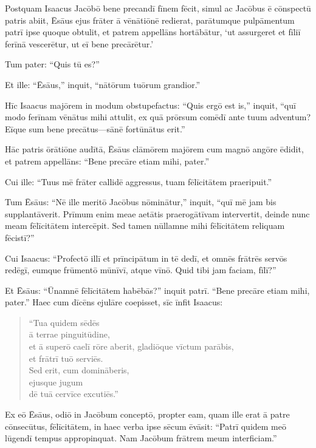 \Versus Postquam Isaacus Jacōbō bene precandī fīnem fēcit, simul ac Jacōbus ē cōnspectū patris abiit, Ēsāus ejus frāter ā vēnātiōnē redierat,
\Versus parātumque pulpāmentum patrī ipse quoque obtulit, et patrem appellāns hortābātur, `ut assurgeret et fīliī ferīnā vescerētur, ut eī bene precārētur.'

\Versus Tum pater: ``Quis tū es?''

Et ille: ``Ēsāus,'' inquit, ``nātōrum tuōrum grandior.''

\Versus Hīc Isaacus majōrem in modum obstupefactus: ``Quis ergō est is,'' inquit, ``quī modo ferīnam vēnātus mihi attulit, ex quā prōrsum comēdī ante tuum adventum? Eīque sum bene precātus—sānē fortūnātus erit.''

\Versus Hāc patris ōrātiōne audītā, Ēsāus clāmōrem majōrem cum magnō angōre ēdidit, et patrem appellāns: ``Bene precāre etiam mihi, pater.''

\Versus Cui ille: ``Tuus mē frāter callidē aggressus, tuam fēlīcitātem praeripuit.''

\Versus Tum Ēsāus: ``Nē ille meritō Jacōbus nōminātur,'' inquit, ``quī mē jam bis supplantāverit. Prīmum enim meae aetātis praerogātīvam intervertit, deinde nunc meam fēlīcitātem intercēpit. Sed tamen nūllamne mihi fēlīcitātem reliquam fēcistī?''

\Versus Cui Isaacus: ``Profectō illī et prīncipātum in tē dedī, et omnēs frātrēs servōs redēgī, eumque frūmentō mūnīvī, atque vīnō. Quid tibi jam faciam, fīlī?''

\Versus Et Ēsāus: ``Ūnamnē fēlīcitātem habēbās?'' inquit patrī. ``Bene precāre etiam mihi, pater.''
Haec cum dīcēns ejulāre coepisset,
\Versus sīc īnfit Isaacus:

\begin{verse}
\begin{patverse*}
``Tua quidem sēdēs\\
 ā terrae pinguitūdine,\\
 et ā superō caelī rōre aberit,
\Versus gladiōque vīctum parābis,\\
 et frātrī tuō serviēs.\\
 Sed erit, cum domināberis,\\
 ejusque jugum \\
 dē tuā cervīce excutiēs.''
\end{patverse*}
\end{verse}

\Versus Ex eō Ēsāus, odiō in Jacōbum conceptō, propter eam, quam ille erat ā patre cōnsecūtus, fēlīcitātem, in haec verba ipse sēcum ēvāsit: ``Patrī quidem meō lūgendī tempus appropinquat. Nam Jacōbum frātrem meum interficiam.''

